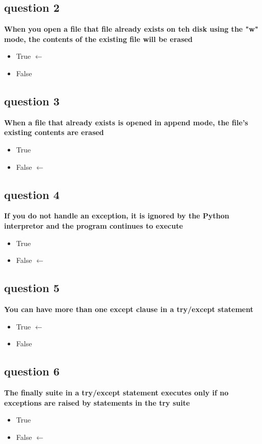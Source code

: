 \documentclass[10pt]{article}
\begin{document}
\subsection*{question 2}
\textbf{When you open a file that file already exists on teh disk using the "w" mode, the contents of the existing file will be erased}
\begin{itemize}
\item True $\leftarrow$
\item False
\end{itemize}
\subsection*{question 3}
\textbf{When a file that already exists is opened in append mode, the file's existing contents are erased}
\begin{itemize}
\item True
\item False $\leftarrow$
\end{itemize}
\subsection*{question 4}
\textbf{If you do not handle an exception, it is ignored by the Python interpretor and the program continues to execute}
\begin{itemize}
\item True
\item False $\leftarrow$
\end{itemize}
\subsection*{question 5}
\textbf{You can have more than one except clause in a try/except statement}
\begin{itemize}
\item True $\leftarrow$
\item False
\end{itemize}
\subsection*{question 6}
\textbf{The finally suite in a try/except statement executes only if no exceptions are raised by statements in the try suite}
\begin{itemize}
\item True
\item False $\leftarrow$
\end{itemize}
\end{document}
